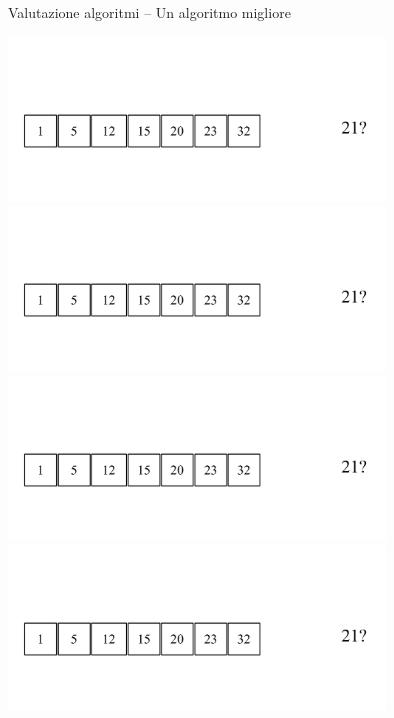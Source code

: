 \begin{frame}{Valutazione algoritmi -- Un algoritmo migliore}
\begin{overprint}
\centering\includegraphics[width=10cm,page=5]{binarysearch.pdf}
\centering\includegraphics[width=10cm,page=6]{binarysearch.pdf}
\centering\includegraphics[width=10cm,page=7]{binarysearch.pdf}
\centering\includegraphics[width=10cm,page=8]{binarysearch.pdf}
\end{overprint}


\end{frame}

